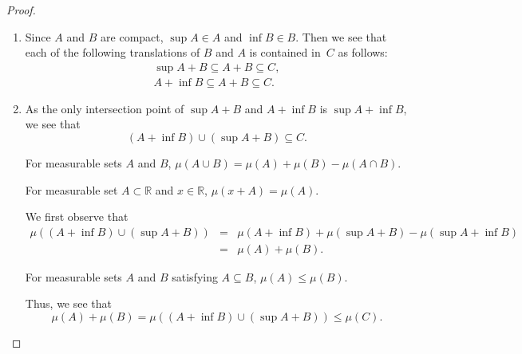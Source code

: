 \begin{proof}
\begin{enumerate}
        \item Since \(A\) and \(B\) are compact, { \(\sup A \in A\) and \(\inf B \in B\). Then} we see that each of the following translations of \(B\) and \(A\) is contained in~\(C\) as follows:
        \begin{eqnarray*}
            \sup A + B
            {
             \subseteq A + B} \subseteq C, \\
            A + \inf B
            {
             \subseteq A + B} \subseteq C.
        \end{eqnarray*}
        \item As the only intersection point of \(\sup A + B\) and \(A + \inf B\) is \(\sup A + \inf B\), we see that
        \begin{equation*}
            (A + \inf B) \cup (\sup A + B) \subseteq C.
        \end{equation*}
        {
        \begin{lemma}
            For measurable sets \(A\) and \(B\),
            \(\mu(A \cup B) = \mu(A) + \mu(B) - \mu(A \cap B)\).
        \end{lemma}
        \begin{lemma}
            For measurable set \(A\subset \mathbb{R}\) and \(x \in \mathbb{R}\), \(\mu(x+A) = \mu(A)\).
        \end{lemma}
        }
        We first observe that
        \begin{eqnarray*}
            \mu\left((A+\inf B) \cup (\sup A + B)\right) & = & \mu(A+\inf B) + \mu(\sup A + B) - \mu(\sup A + \inf B)\\
            & = & \mu(A) + \mu(B).
        \end{eqnarray*}
        {
        \begin{lemma}
            For measurable sets \(A\) and \(B\) satisfying \(A \subseteq B\), \(\mu(A) \leq \mu(B)\).
        \end{lemma}
        }
        Thus, we see that
        \begin{equation*}
            \mu(A) + \mu(B) = \mu\left((A+\inf B) \cup (\sup A + B)\right) \leq \mu(C).
        \end{equation*}
    \end{enumerate}
\end{proof}